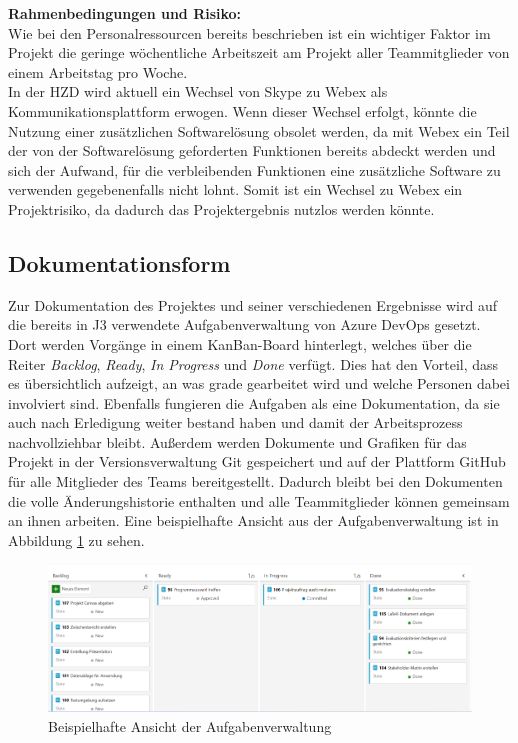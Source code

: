 \documentclass[ThesisDJ.tex]{subfiles}
\begin{document}
	\textbf{Rahmenbedingungen und Risiko:}\medskip\\
	Wie bei den Personalressourcen bereits beschrieben ist ein wichtiger Faktor im Projekt die geringe wöchentliche Arbeitszeit am Projekt aller Teammitglieder von einem Arbeitstag pro Woche.\\	
	In der HZD wird aktuell ein Wechsel von Skype zu Webex als Kommunikationsplattform erwogen. Wenn dieser Wechsel erfolgt, könnte die Nutzung einer zusätzlichen Softwarelösung obsolet werden, da mit Webex ein Teil der von der Softwarelösung geforderten Funktionen bereits abdeckt werden und sich der Aufwand, für die verbleibenden Funktionen eine zusätzliche Software zu verwenden gegebenenfalls nicht lohnt. Somit ist ein Wechsel zu Webex ein Projektrisiko, da dadurch das Projektergebnis nutzlos werden könnte. 

	
	\subsection{Dokumentationsform}
  Zur Dokumentation des Projektes und seiner verschiedenen Ergebnisse wird auf die bereits in J3 verwendete Aufgabenverwaltung von Azure DevOps gesetzt.
  Dort werden Vorgänge in einem KanBan-Board hinterlegt, welches über die Reiter \emph{Backlog}, \emph{Ready}, \emph{In Progress} und \emph{Done} verfügt.
  Dies hat den Vorteil, dass es übersichtlich aufzeigt, an was grade gearbeitet wird und welche Personen dabei involviert sind. Ebenfalls fungieren die 
  Aufgaben als eine Dokumentation, da sie auch nach Erledigung weiter bestand haben und damit der Arbeitsprozess nachvollziehbar bleibt. Außerdem werden 
  Dokumente und Grafiken für das Projekt in der Versionsverwaltung Git gespeichert und auf der Plattform GitHub für alle Mitglieder des Teams bereitgestellt. Dadurch bleibt 
  bei den Dokumenten die volle Änderungshistorie enthalten und alle Teammitglieder können gemeinsam an ihnen arbeiten. Eine beispielhafte 
  Ansicht aus der Aufgabenverwaltung ist in Abbildung \ref{fig:taskmgmt} zu sehen.

  \begin{figure}
    \includegraphics[scale=0.5]{ADO_Board.png}
    \centering
    \caption{Beispielhafte Ansicht der Aufgabenverwaltung}
    \label{fig:taskmgmt}
  \end{figure}
	
\end{document}
